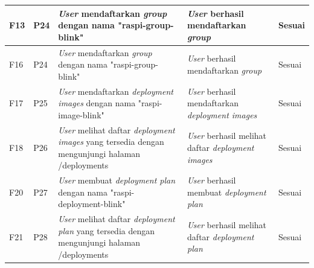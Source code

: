 \begin{table}[ht]
\begin{tabular}{|p{2cm}|p{2cm}|p{4cm}|p{3cm}|p{2cm}|}
    \hline
    F13                       & P24                                                 & \textit{User} mendaftarkan \textit{group} dengan nama "raspi-group-blink"                                                                                                                                                             & \textit{User} berhasil mendaftarkan \textit{group}                     & Sesuai  \\
    \hline
    F16                       & P24                                                 & \textit{User} mendaftarkan \textit{group} dengan nama "raspi-group-blink"                                                                                                                                                             & \textit{User} berhasil mendaftarkan \textit{group}                     & Sesuai  \\
    \hline
    F17                       & P25                                                 & \textit{User} mendaftarkan \textit{deployment images} dengan nama "raspi-image-blink"                                                                                                                                                 & \textit{User} berhasil mendaftarkan \textit{deployment images}         & Sesuai  \\
    \hline
    F18                       & P26                                                 & \textit{User} melihat daftar \textit{deployment images} yang tersedia dengan mengunjungi halaman /deployments                                                                                                                         & \textit{User} berhasil melihat daftar \textit{deployment images}       & Sesuai  \\
    \hline
    F20                       & P27                                                 & \textit{User} membuat \textit{deployment plan} dengan nama "raspi-deployment-blink"                                                                                                                                                   & \textit{User} berhasil membuat \textit{deployment plan}                & Sesuai  \\
    \hline
    F21                       & P28                                                 & \textit{User} melihat daftar \textit{deployment plan} yang tersedia dengan mengunjungi halaman /deployments                                                                                                                           & \textit{User} berhasil melihat daftar \textit{deployment plan}         & Sesuai  \\

\end{tabular}
\end{table}
